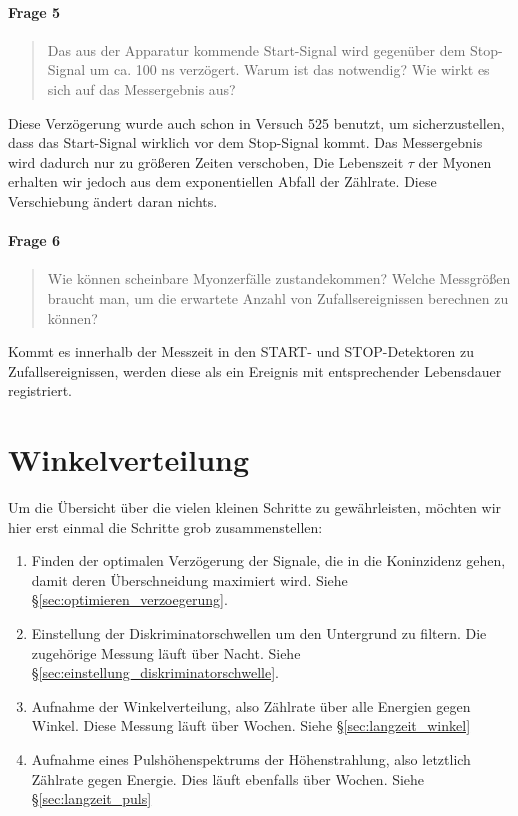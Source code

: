 \documentclass[11pt, ngerman, fleqn, DIV=15, headinclude, BCOR=2cm]{scrreprt}
\begin{document}
\subsubsection{Frage 5}

\begin{quote}
    Das aus der Apparatur kommende Start-Signal wird gegenüber dem Stop-Signal
    um ca. 100 ns verzögert. Warum ist das notwendig? Wie wirkt es sich auf das
    Messergebnis aus?
\end{quote}

Diese Verzögerung wurde auch schon in Versuch 525 benutzt, um sicherzustellen,
dass das Start-Signal wirklich vor dem Stop-Signal kommt. Das Messergebnis wird
dadurch nur zu größeren Zeiten verschoben, Die Lebenszeit $\tau$ der Myonen
erhalten wir jedoch aus dem exponentiellen Abfall der Zählrate. Diese
Verschiebung ändert daran nichts.

\subsubsection{Frage 6}

\begin{quote}
    Wie können scheinbare Myonzerfälle zustandekommen? Welche Messgrößen
    braucht man, um die erwartete Anzahl von Zufallsereignissen berechnen zu
    können?
\end{quote}

Kommt es innerhalb der Messzeit in den START- und STOP-Detektoren zu
Zufallsereignissen, werden diese als ein Ereignis mit entsprechender
Lebensdauer registriert.


\chapter{Winkelverteilung}

Um die Übersicht über die vielen kleinen Schritte zu gewährleisten, möchten wir
hier erst einmal die Schritte grob zusammenstellen:

\begin{enumerate}
    \item
        Finden der optimalen Verzögerung der Signale, die in die Koninzidenz
        gehen, damit deren Überschneidung maximiert wird. Siehe
        §\ref{sec:optimieren_verzoegerung}.

    \item
        Einstellung der Diskriminatorschwellen um den Untergrund zu filtern.
        Die zugehörige Messung läuft über Nacht. Siehe
        §\ref{sec:einstellung_diskriminatorschwelle}.

    \item
        Aufnahme der Winkelverteilung, also Zählrate über alle Energien gegen
        Winkel. Diese Messung läuft über Wochen. Siehe
        §\ref{sec:langzeit_winkel}

    \item
        Aufnahme eines Pulshöhenspektrums der Höhenstrahlung, also letztlich
        Zählrate gegen Energie. Dies läuft ebenfalls über Wochen. Siehe
        §\ref{sec:langzeit_puls}
\end{enumerate}
\end{document}
